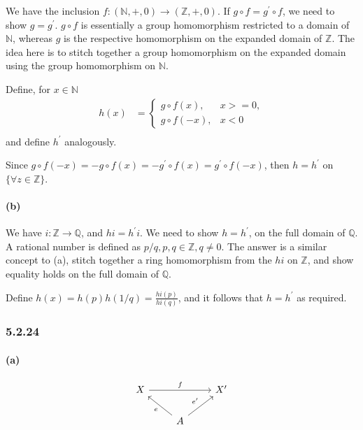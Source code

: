 \documentclass{article}
\begin{document}
We have the inclusion $f: (\mathds{N},+,0) \rightarrow (\mathds{Z},+,0)$. If $g\circ f = g^\prime\circ f$, we need to show $g=g^\prime$. $g\circ f$ is essentially a group homomorphism restricted to a domain of $\mathds{N}$, whereas $g$ is the respective homomorphism on the expanded domain of $\mathds{Z}$. The idea here is to stitch together a group homomorphism on the expanded domain using the group homomorphism on $\mathds{N}$.

Define, for $x \in \mathds{N}$
\begin{align*}
  h(x) &= \begin{cases}
    g \circ f(x), &  x >=0,  \\
    g \circ f(-x), &  x < 0
  \end{cases} \\
\end{align*} and define $h^\prime$ analogously.

Since $g \circ f(-x) = -g \circ f (x) = -g^\prime \circ f (x) = g^\prime \circ f (-x)$, then $h=h^\prime$ on $\{\forall z \in \mathds{Z}\}$.

\paragraph{(b)}
We have $i: \mathds{Z} \rightarrow \mathds{Q}$, and $hi=h^\prime i$. We need to show $h=h^
\prime$, on the full domain of $\mathds{Q}$.
A rational number is defined as $p/q, p,q \in \mathds{Z}, q \neq 0$. The answer is a similar concept to (a), stitch together a ring homomorphism from the $hi$ on $\mathds{Z}$, and show equality holds on the full domain of $\mathds{Q}$.

Define $h(x) = h(p)h(1/q) = \frac{hi(p)}{hi(q)}$, and it follows that $h=h^\prime$ as required.

\subsubsection*{5.2.24}
\paragraph{(a)}

\begin{equation*}
\begin{tikzcd}
X \arrow{rr}{f} & & X^\prime \\
& \arrow{ul}{e} A \arrow{ur}{e^\prime}
\end{tikzcd}
\end{equation*}
\end{document}
